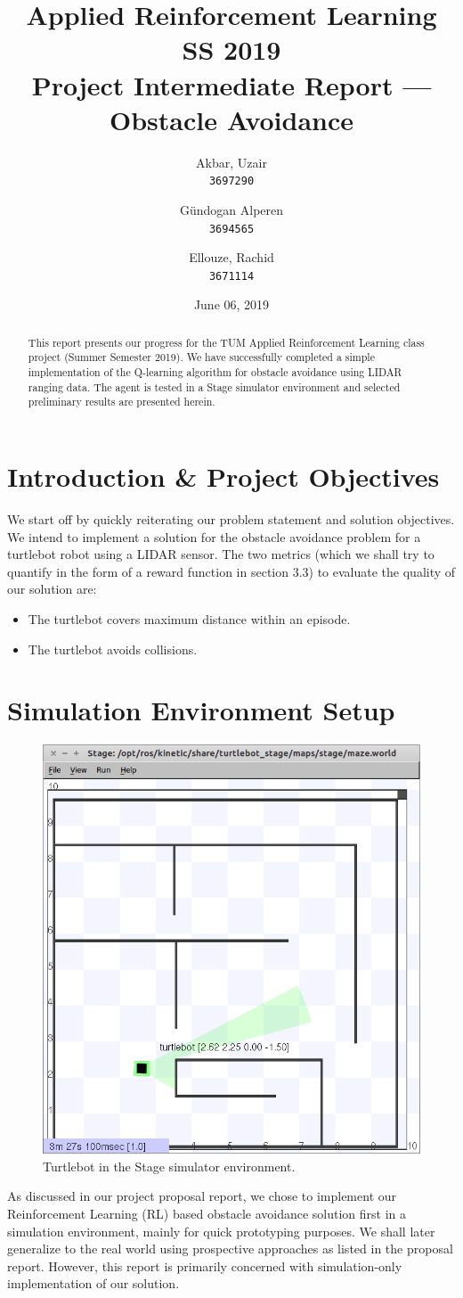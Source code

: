 \documentclass{article}
\title{Applied Reinforcement Learning\\
        \vspace{-0.25cm}
        {\large SS 2019}\\
        \vspace{0.25cm}
        {Project Intermediate Report --- Obstacle Avoidance}}
\author{
  \small Akbar, Uzair\\
  \small \texttt{3697290}
  \and
  \small G\"undogan Alperen\\
  \small \texttt{3694565}
  \and
  \small Ellouze, Rachid \\
  \small \texttt{3671114}
}
\date{June 06, 2019}
\begin{document}
\begin{titlingpage}
    \maketitle
    \begin{abstract}
This report presents our progress for the TUM Applied Reinforcement Learning class project (Summer Semester 2019). We have successfully completed a simple implementation of the Q-learning algorithm for obstacle avoidance using LIDAR ranging data. The agent is tested in a Stage simulator environment and selected preliminary results are presented herein.
    \end{abstract}
    \tableofcontents
\end{titlingpage}

\section{Introduction \& Project Objectives}
We start off by quickly reiterating our problem statement and solution objectives. We intend to implement a solution for the obstacle avoidance problem for a turtlebot robot using a LIDAR sensor. The two metrics (which we shall try to quantify in the form of a reward function in section 3.3) to evaluate the quality of our solution are:
\begin{itemize}
\item The turtlebot covers maximum distance within an episode.
\item The turtlebot avoids collisions.
\end{itemize}

\section{Simulation Environment Setup}
\begin{figure}[ht]
 \centering
 \includegraphics[width=.33\textwidth]{stageSim.png}
  \caption{Turtlebot in the Stage simulator environment.}
  \label{fig:stage}
\end{figure}
As discussed in our project proposal report, we chose to implement our Reinforcement Learning (RL) based obstacle avoidance solution first in a simulation environment, mainly for quick prototyping purposes. We shall later generalize to the real world using prospective approaches as listed in the proposal report. However, this report is primarily concerned with simulation-only implementation of our solution.
\end{document}
